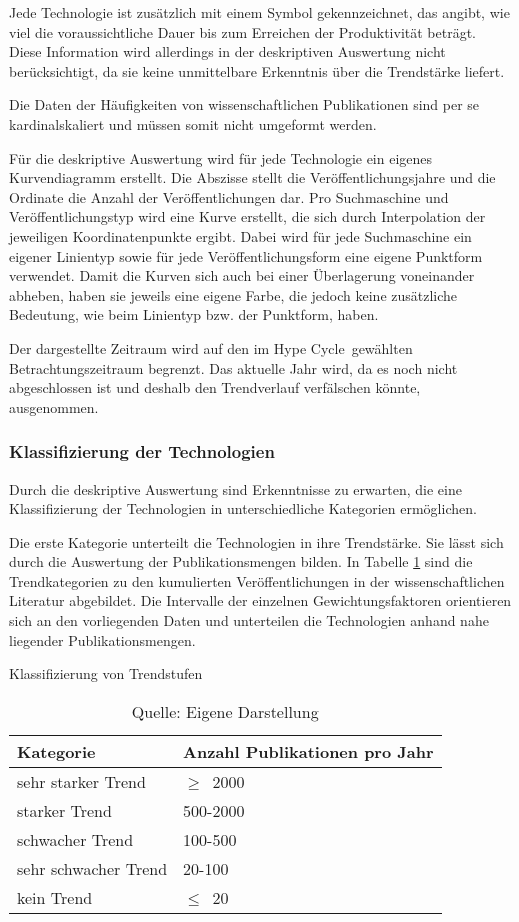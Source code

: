 Jede Technologie ist zusätzlich mit einem Symbol gekennzeichnet, das angibt, wie viel die voraussichtliche Dauer bis zum Erreichen der Produktivität beträgt. Diese Information wird allerdings in der deskriptiven Auswertung nicht berücksichtigt, da sie keine unmittelbare Erkenntnis über die Trendstärke liefert.

Die Daten der Häufigkeiten von wissenschaftlichen Publikationen sind per se kardinalskaliert und müssen somit nicht umgeformt werden.

Für die deskriptive Auswertung wird für jede Technologie ein eigenes Kurvendiagramm erstellt. Die Abszisse stellt die Veröffentlichungsjahre und die Ordinate die Anzahl der Veröffentlichungen dar. Pro Suchmaschine und Veröffentlichungstyp wird eine Kurve erstellt, die sich durch Interpolation der jeweiligen Koordinatenpunkte ergibt. Dabei wird für jede Suchmaschine ein eigener Linientyp sowie für jede Veröffentlichungsform eine eigene Punktform verwendet. Damit die Kurven sich auch bei einer Überlagerung voneinander abheben, haben sie jeweils eine eigene Farbe, die jedoch keine zusätzliche Bedeutung, wie beim Linientyp bzw. der Punktform, haben.

Der dargestellte Zeitraum wird auf den im \glqq Hype Cycle\grqq~gewählten Betrachtungszeitraum begrenzt. Das aktuelle Jahr wird, da es noch nicht abgeschlossen ist und deshalb den Trendverlauf verfälschen könnte, ausgenommen.

\subsubsection{Klassifizierung der Technologien}
Durch die deskriptive Auswertung sind Erkenntnisse zu erwarten, die eine Klassifizierung der Technologien in unterschiedliche Kategorien ermöglichen.

Die erste Kategorie unterteilt die Technologien in ihre Trendstärke. Sie lässt sich durch die Auswertung der Publikationsmengen bilden. In Tabelle \ref{tab:class_trend_mt} sind die Trendkategorien zu den kumulierten Veröffentlichungen in der wissenschaftlichen Literatur abgebildet. Die Intervalle der einzelnen Gewichtungsfaktoren orientieren sich an den vorliegenden Daten und unterteilen die Technologien anhand nahe liegender Publikationsmengen.

\begin{table}
	\caption{Klassifizierung von Trendstufen}
	\selectfont
	\footnotesize
	\centering
	\label{tab:class_trend_mt}
	\begin{tabularx}{\linewidth}{XX}
		Kategorie & Anzahl Publikationen pro Jahr \\
		\hline
		sehr starker Trend & $\geq$~2000 \\
		starker Trend & 500-2000 \\
		schwacher Trend & 100-500 \\
		sehr schwacher Trend & 20-100 \\
		kein Trend & $\leq$~20 \\
	\end{tabularx}
	\caption*{Quelle: Eigene Darstellung}
\end{table}

